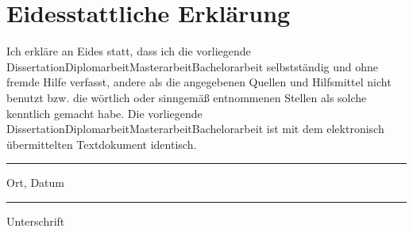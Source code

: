 \newpage
\section*{Eidesstattliche Erklärung}
Ich erkläre an Eides statt, dass ich die vorliegende {\ifcase\type Dissertation\or Diplomarbeit\or Masterarbeit\or Bachelorarbeit\fi} selbstständig und ohne fremde Hilfe verfasst, andere als die angegebenen Quellen und Hilfsmittel nicht benutzt bzw. die wörtlich oder sinngemäß entnommenen Stellen als solche kenntlich gemacht habe.
Die vorliegende {\ifcase\type Dissertation\or Diplomarbeit\or Masterarbeit\or Bachelorarbeit\fi} ist mit dem elektronisch übermittelten Textdokument identisch.

\vspace{2.5cm}
\parbox{4cm}{\hrule
\strut \footnotesize Ort, Datum} \hfill\parbox{4cm}{\hrule
\strut \footnotesize Unterschrift}